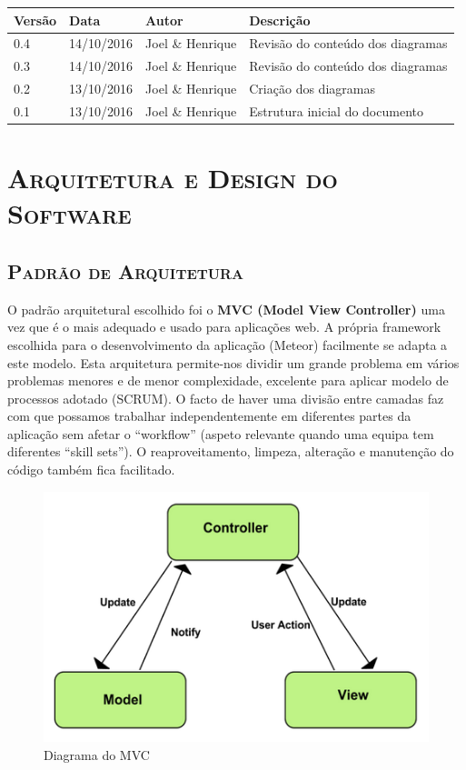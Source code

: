 \documentclass[12pt]{article}
\begin{document}
\begin{center}
\begin{tabular}{ | m{1cm} | m{5cm}| m{3cm} | m{5cm} | } 
\hline
Versão & Data & Autor & Descrição \\ 
\hline
0.4 & 14/10/2016 & Joel \& Henrique & Revisão do conteúdo dos diagramas\\ 
\hline
0.3 & 14/10/2016 & Joel \& Henrique & Revisão do conteúdo dos diagramas\\ 
\hline
0.2 & 13/10/2016 & Joel \& Henrique & Criação dos diagramas\\ 
\hline
0.1 & 13/10/2016 & Joel \& Henrique & Estrutura inicial do documento\\ 
\hline
\end{tabular}
\end{center}




\pagebreak

\section{ \textsc{Arquitetura e Design do Software}}
\subsection{ \textsc{Padrão de Arquitetura}}
O padrão arquitetural escolhido foi o \textbf{MVC (Model View 	Controller)} uma vez que é o mais adequado e usado para aplicações web. A própria framework escolhida para o desenvolvimento da aplicação (Meteor) facilmente se adapta a este modelo. 
Esta arquitetura permite-nos dividir um grande problema em vários problemas menores e de menor complexidade, excelente para aplicar modelo de processos adotado (SCRUM). O facto de haver uma divisão entre camadas faz com que possamos trabalhar independentemente em diferentes partes da aplicação sem afetar o “workflow” (aspeto relevante quando uma equipa tem diferentes “skill sets”). O reaproveitamento, limpeza, alteração e manutenção do código também fica facilitado.


\vspace{5mm}

\begin{figure}[h!]
	\centering \includegraphics[width=12cm]{public/Architecture and Design of Software_1.png}
	\caption{Diagrama do MVC}
\end{figure}
\end{document}

